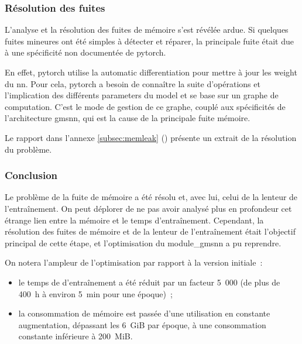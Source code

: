 \subsubsection{Résolution des fuites}
L'analyse et la résolution des fuites de mémoire s'est révélée ardue. Si quelques fuites mineures ont été simples à détecter et réparer, la principale fuite était due à une spécificité non documentée de \gls{pytorch}.

En effet, \gls{pytorch} utilise la \gls{automatic differentiation} pour mettre à jour les \gls{weight} du \gls{nn}.
Pour cela, \gls{pytorch} a besoin de connaître la suite d'opérations et l'implication des différents \glspl{parameter} du \gls{model} et se base sur un \og graphe de computation\fg{}.
C'est le mode de gestion de ce graphe, couplé aux spécificités de l'architecture \gls{gmsnn}, qui est la cause de la principale fuite mémoire.

Le rapport dans l'annexe \ref{subsec:memleak} () présente un extrait de la résolution du problème.

\subsubsection{Conclusion}
Le problème de la fuite de mémoire a été résolu et, avec lui, celui de la lenteur de l'entraînement.
On peut déplorer de ne pas avoir analysé plus en profondeur cet étrange lien entre la mémoire et le temps d'entraînement.
Cependant, la résolution des fuites de mémoire et de la lenteur de l'entraînement était l'objectif principal de cette étape, et l'optimisation du \gls{module_gmsnn} a pu reprendre.

On notera l'ampleur de l'optimisation par rapport à la version initiale~:
\begin{itemize}
	\item le temps de d'entraînement a été réduit par un facteur 5~000 (de plus de 400~h à environ 5~min pour une époque)~;
	\item la consommation de mémoire est passée d'une utilisation en constante augmentation, dépassant les 6~GiB par époque, à une consommation constante inférieure à 200~MiB.
\end{itemize}\vspace{1em}